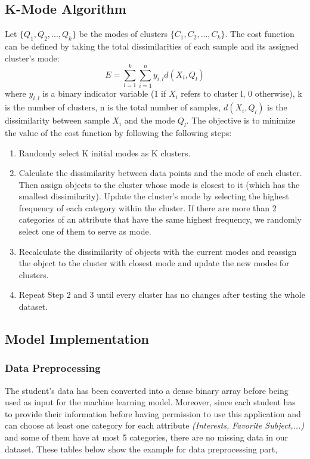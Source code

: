\documentclass[12pt]{article}
\begin{document}
\subsection{K-Mode Algorithm\citep{huang1998extensions}}
Let $\{Q_1,Q_2,...,Q_k\}$ be the modes of clusters $\{C_1,C_2,...,C_k\}$. The cost function can be defined by taking the total dissimilarities of each sample and its assigned cluster's mode: 
$$E = \sum_{l=1}^{k}\sum_{i=1}^{n}y_{i,l}d(X_i,Q_l)$$ 
where $y_{i,l}$ is a binary indicator variable (1 if $X_i$ refers to cluster l, 0 otherwise), k is the number of clusters, n is the total number of samples, $d(X_i,Q_l)$ is the dissimilarity between sample $X_i$ and the mode $Q_l$. The objective is to minimize the value of the cost function by following the following steps: 

\begin{enumerate}
    \item Randomly select K initial modes as K clusters.
    
    \item Calculate the dissimilarity between data points and the mode of each cluster. Then assign objects to the cluster whose mode is closest to it (which has the smallest dissimilarity). Update the cluster’s mode by selecting the highest frequency of each category within the cluster. If there are more than 2 categories of an attribute that have the same highest frequency, we randomly select one of them to serve as mode.
    
    \item Recalculate the dissimilarity of objects with the current modes and reassign the object to the cluster with closest mode and update the new modes for clusters.
    
    \item Repeat Step 2 and 3 until every cluster has no changes after testing the whole dataset.
\end{enumerate}

\subsection{Model Implementation}
\subsubsection{Data Preprocessing}
The student's data has been converted into a dense binary array before being used as input for the machine learning model. Moreover, since each student has to provide their information before having permission to use this application and can choose at least one category for each attribute \emph{(Interests, Favorite Subject,...)} and some of them have at most 5 categories, there are no missing data in our dataset. These tables below show the example for data preprocessing part,
\end{document}
